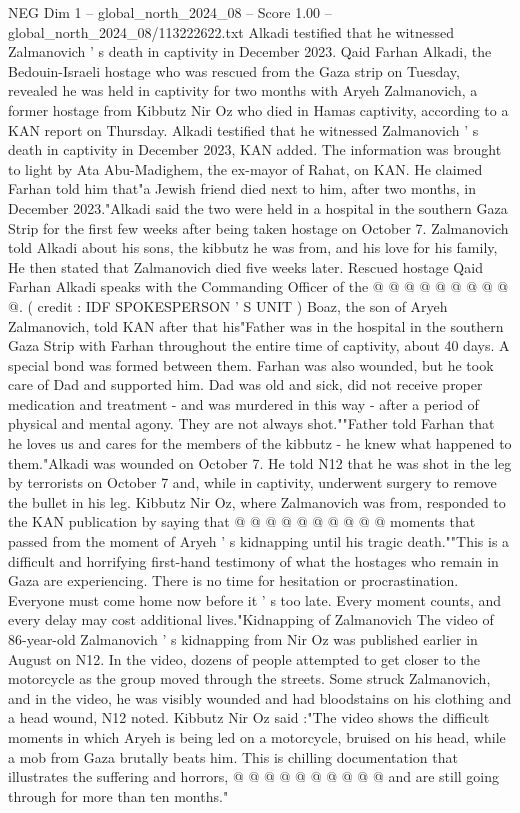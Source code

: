 \begin{textsample}{NEG Dim 1 – global\_north\_2024\_08 – Score 1.00 – global\_north\_2024\_08/113222622.txt}  \label{ex:f1_neg_385}
Alkadi testified that he witnessed Zalmanovich ' s death in captivity in December 2023.
Qaid Farhan Alkadi, the Bedouin-Israeli hostage who was rescued from the Gaza strip on Tuesday, revealed he was held in captivity for two months with Aryeh Zalmanovich, a former hostage from Kibbutz Nir Oz who died in Hamas captivity, according to a KAN report on Thursday.
Alkadi testified that he witnessed Zalmanovich ' s death in captivity in December 2023, KAN added.
The information was brought to light by Ata Abu-Madighem, the ex-mayor of Rahat, on KAN.
He claimed Farhan told him that"a Jewish friend died next to him, after two months, in December 2023."Alkadi said the two were held in a hospital in the southern Gaza Strip for the first few weeks after being taken hostage on October 7.
Zalmanovich told Alkadi about his sons, the kibbutz he was from, and his love for his family, He then stated that Zalmanovich died five weeks later.
Rescued hostage Qaid Farhan Alkadi speaks with the Commanding Officer of the @ @ @ @ @ @ @ @ @ @. ( credit : IDF SPOKESPERSON ' S UNIT ) Boaz, the son of Aryeh Zalmanovich, told KAN after that his"Father was in the hospital in the southern Gaza Strip with Farhan throughout the entire time of captivity, about 40 days.
A special bond was formed between them.
Farhan was also wounded, but he took care of Dad and supported him.
Dad was old and sick, did not receive proper medication and treatment - and was murdered in this way - after a period of physical and mental agony.
They are not always shot.""Father told Farhan that he loves us and cares for the members of the kibbutz - he knew what happened to them."Alkadi was wounded on October 7.
He told N12 that he was shot in the leg by terrorists on October 7 and, while in captivity, underwent surgery to remove the bullet in his leg.
Kibbutz Nir Oz, where Zalmanovich was from, responded to the KAN publication by saying that @ @ @ @ @ @ @ @ @ @ moments that passed from the moment of Aryeh ' s kidnapping until his tragic death.""This is a difficult and horrifying first-hand testimony of what the hostages who remain in Gaza are experiencing.
There is no time for hesitation or procrastination.
Everyone must come home now before it ' s too late.
Every moment counts, and every delay may cost additional lives."Kidnapping of Zalmanovich The video of 86-year-old Zalmanovich ' s kidnapping from Nir Oz was published earlier in August on N12.
In the video, dozens of people attempted to get closer to the motorcycle as the group moved through the streets.
Some struck Zalmanovich, and in the video, he was visibly wounded and had bloodstains on his clothing and a head wound, N12 noted.
Kibbutz Nir Oz said :"The video shows the difficult moments in which Aryeh is being led on a motorcycle, bruised on his head, while a mob from Gaza brutally beats him.
This is chilling documentation that illustrates the suffering and horrors, @ @ @ @ @ @ @ @ @ @ and are still going through for more than ten months."

\end{textsample}
